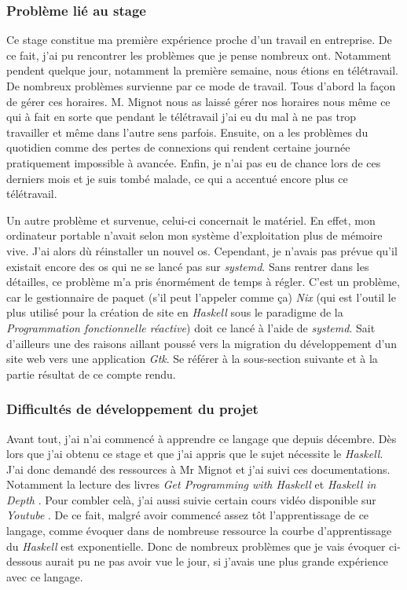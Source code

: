 \subsubsection{Problème lié au stage}

Ce stage constitue ma première expérience proche d'un travail en entreprise. De 
ce fait, j'ai pu rencontrer les problèmes que je pense nombreux ont. Notamment 
pendent quelque jour, notamment la première semaine, nous étions en télétravail.
De nombreux problèmes survienne par ce mode de travail. Tous d'abord la façon de 
gérer ces horaires. M. Mignot nous as laissé gérer nos horaires nous même ce qui 
à fait en sorte que pendant le télétravail j'ai eu du mal à ne pas trop 
travailler et même dans l'autre sens parfois. Ensuite, on a les problèmes du 
quotidien comme des pertes de connexions qui rendent certaine journée 
pratiquement impossible à avancée. Enfin, je n'ai pas eu de chance lors de ces 
derniers mois et je suis tombé malade, ce qui a accentué encore plus ce 
télétravail.

\newpage

Un autre problème et survenue, celui-ci concernait le matériel. En effet, mon 
ordinateur portable n'avait selon mon système d'exploitation plus de mémoire 
vive. J'ai alors dù réinstaller un nouvel os. Cependant, je n'avais pas prévue 
qu'il existait encore des os qui ne se lancé pas sur \textit{systemd}. Sans 
rentrer dans les détailles, ce problème m’a pris énormément de temps à régler. 
C'est un problème, car le gestionnaire de paquet (s'il peut l'appeler comme ça)
\textit{Nix} (qui est l'outil le plus utilisé pour la création de site en 
\textit{Haskell} sous le paradigme de la \textit{Programmation fonctionnelle 
réactive}) doit ce lancé à l'aide de \textit{systemd}. Sait d'ailleurs 
une des raisons aillant poussé vers la migration du développement d'un site web 
vers une application \textit{Gtk}. Se référer à la sous-section suivante et à la 
partie résultat de ce compte rendu. 

\subsubsection{Difficultés de développement du projet}

Avant tout, j'ai n'ai commencé à apprendre ce langage que depuis décembre. 
Dès lors que j'ai obtenu ce stage et que j'ai appris que le sujet nécessite le 
\textit{Haskell}. J'ai donc demandé des ressources à Mr Mignot et j'ai suivi 
ces documentations. Notamment la lecture des livres 
\textit{Get Programming with Haskell} et \textit{Haskell in Depth}
\cite{bookWithHaskell, haskellInDepth}. Pour combler celà, j'ai aussi suivie 
certain cours vidéo disponible sur \textit{Youtube}
\cite{playHaksell1, playHaksell2}. De ce fait, malgré avoir commencé assez 
tôt l'apprentissage de ce langage, comme évoquer dans de nombreuse ressource la 
courbe d'apprentissage du \textit{Haskell} est exponentielle. Donc de nombreux 
problèmes que je vais évoquer ci-dessous aurait pu ne pas avoir vue le jour, si 
j'avais une plus grande expérience avec ce langage.

